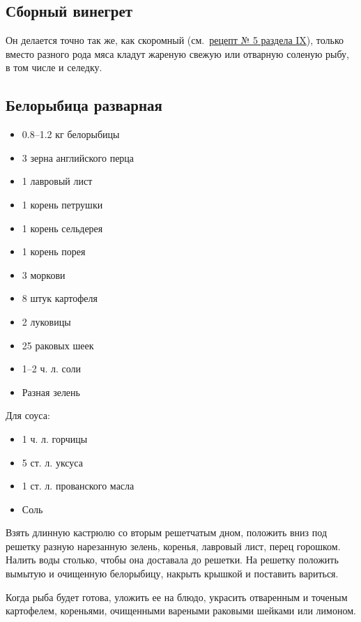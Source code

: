 \subsection{Сборный винегрет}

Он делается точно так же, как скоромный (см.~\hyperref[5vinegret]{рецепт № 5 раздела IX}), только вместо разного рода мяса кладут жареную свежую или отварную соленую рыбу, в том числе и селедку.

\subsection{Белорыбица разварная}

\begin{itemize}
	\item 0.8–1.2 кг белорыбицы 
    \item 3 зерна английского перца 
    \item 1 лавровый лист 
    \item 1 корень петрушки
    \item 1 корень сельдерея 
    \item 1 корень порея 
    \item 3 моркови 
    \item 8 штук картофеля 
    \item 2 луковицы 
    \item 25 раковых шеек 
    \item 1–2 ч. л. соли 
    \item Разная зелень
\end{itemize}

Для соуса: 

\begin{itemize}
	\item 1 ч. л. горчицы 
    \item 5 ст. л. уксуса 
    \item 1 ст. л. прованского масла
    \item Соль
\end{itemize}

Взять длинную кастрюлю со вторым решетчатым дном, положить вниз под решетку разную нарезанную зелень, коренья, лавровый лист, перец горошком. Налить воды столько, чтобы она доставала до решетки. На решетку положить вымытую и очищенную белорыбицу, накрыть крышкой и поставить вариться.

Когда рыба будет готова, уложить ее на блюдо, украсить отваренным и точеным картофелем, кореньями, очищенными вареными раковыми шейками или лимоном.

